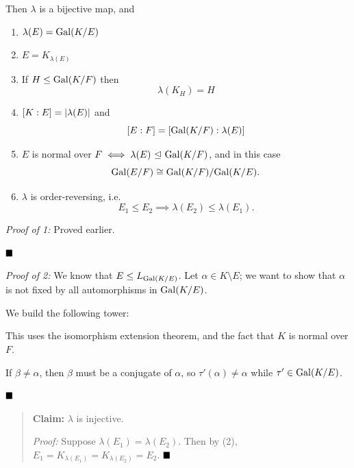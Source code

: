 Then \(\lambda\) is a bijective map, and

\begin{enumerate}
\def\labelenumi{\arabic{enumi}.}
\item
  \(\lambda(E) = \mathrm{Gal}(K/E)\)
\item
  \(E = K_{\lambda(E)}\)
\item
  If \(H \leq \mathrm{Gal}(K/F)\) then \[
  \lambda(K_H) = H
  \]
\item
  \([K: E] = {\left\lvert {\lambda(E)} \right\rvert}\) and \[
  [E: F] = [\mathrm{Gal}(K/F): \lambda(E)]
  \]
\item
  \(E\) is normal over \(F \iff \lambda(E) {~\trianglelefteq~} \mathrm{Gal}(K/F)\), and in
  this case \[
  \mathrm{Gal}(E/F) \cong \mathrm{Gal}(K/F) / \mathrm{Gal}(K/E)
  .\]
\item
  \(\lambda\) is order-reversing, i.e. \[
  E_1 \leq E_2 \implies \lambda(E_2) \leq \lambda(E_1)
  .\]
\end{enumerate}

\emph{Proof of 1:} Proved earlier.

\(\qed\)

\emph{Proof of 2:} We know that \(E \leq L_{\mathrm{Gal}(K/E)}\). Let
\(\alpha \in K\setminus E\); we want to show that \(\alpha\) is not
fixed by all automorphisms in \(\mathrm{Gal}(K/E)\).

We build the following tower:

\begin{center}
\end{center}

This uses the isomorphism extension theorem, and the fact that \(K\) is
normal over \(F\).

If \(\beta\neq \alpha\), then \(\beta\) must be a conjugate of
\(\alpha\), so \(\tau'(\alpha) \neq \alpha\) while
\(\tau' \in \mathrm{Gal}(K/E)\).

\(\qed\)

\begin{quote}
\textbf{Claim:} \(\lambda\) is injective.

\emph{Proof:} Suppose \(\lambda(E_1) = \lambda(E_2)\). Then by (2),
\(E_1 = K_{\lambda(E_1)} = K_{\lambda(E_2)} = E_2\). \(\qed\)
\end{quote}

